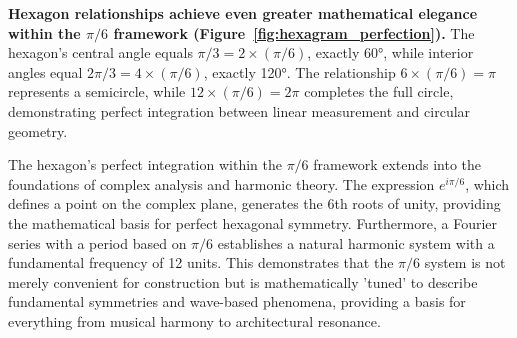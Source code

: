 \documentclass[11pt]{article}
\begin{document}
\textbf{Hexagon relationships achieve even greater mathematical elegance within the $\pi/6$ framework (Figure~\ref{fig:hexagram_perfection}).} The hexagon's central angle equals $\pi/3 = 2 \times (\pi/6)$, exactly 60°, while interior angles equal $2\pi/3 = 4 \times (\pi/6)$, exactly 120°. The relationship $6 \times (\pi/6) = \pi$ represents a semicircle, while $12 \times (\pi/6) = 2\pi$ completes the full circle, demonstrating perfect integration between linear measurement and circular geometry.

The hexagon's perfect integration within the $\pi/6$ framework extends into the foundations of complex analysis and harmonic theory. The expression $e^{i\pi/6}$, which defines a point on the complex plane, generates the 6th roots of unity, providing the mathematical basis for perfect hexagonal symmetry. Furthermore, a Fourier series with a period based on $\pi/6$ establishes a natural harmonic system with a fundamental frequency of 12 units. This demonstrates that the $\pi/6$ system is not merely convenient for construction but is mathematically 'tuned' to describe fundamental symmetries and wave-based phenomena, providing a basis for everything from musical harmony to architectural resonance.
\end{document}
